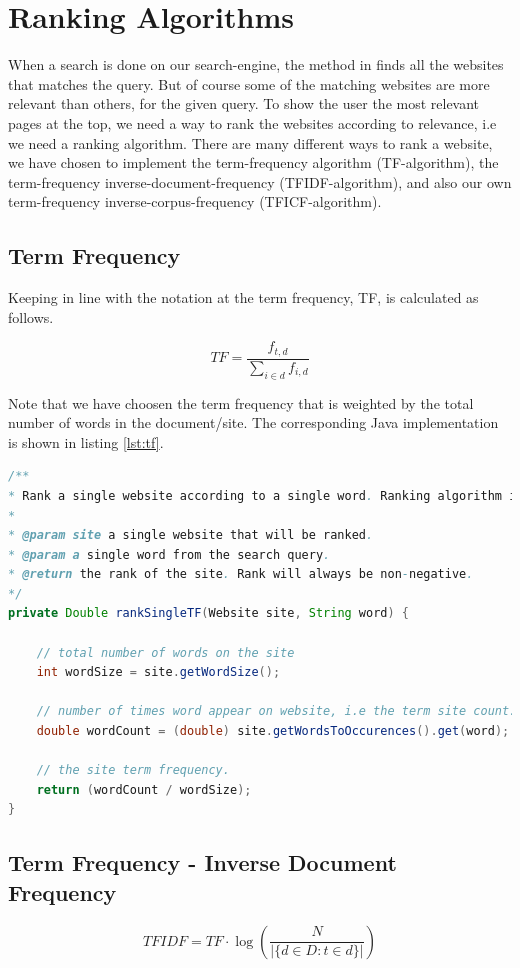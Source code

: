 \section{Ranking Algorithms}
When a search is done on our search-engine, the method  in  finds all the websites that matches the query. But of course some of the matching websites are more relevant than others, for the given query. To show the user the most relevant pages at the top, we need a way to rank the websites according to relevance, i.e we need a ranking algorithm. There are many different ways to rank a website, we have chosen to implement the term-frequency algorithm (TF-algorithm), the term-frequency inverse-document-frequency (TFIDF-algorithm), and also our own  term-frequency inverse-corpus-frequency (TFICF-algorithm).    

\subsection{Term Frequency}
Keeping in line with the notation at \cite{wikiTFIDF} the term frequency, TF, is calculated as follows.

\[ TF = \frac{f_{t,d}}{\sum_{i \in d}f_{i,d}} \]

Note that we have choosen the term frequency that is weighted by the total number of words in the document/site. The corresponding Java implementation is shown in listing \ref{lst:tf}.

\begin{lstlisting}[language=Java,
					caption={Implementation of calculating TF rating.},
					label={lst:tf}]
/**
* Rank a single website according to a single word. Ranking algorithm is TF
* 
* @param site a single website that will be ranked.
* @param a single word from the search query.
* @return the rank of the site. Rank will always be non-negative.
*/
private Double rankSingleTF(Website site, String word) {

	// total number of words on the site
	int wordSize = site.getWordSize();
	
	// number of times word appear on website, i.e the term site count.
	double wordCount = (double) site.getWordsToOccurences().get(word);
	
	// the site term frequency.
	return (wordCount / wordSize);
}
\end{lstlisting}


\subsection{Term Frequency - Inverse Document Frequency}
\[ TFIDF = TF \cdot \log{\left(\frac{N}{|\{d \in D : t \in d \}|}\right)}  \]

